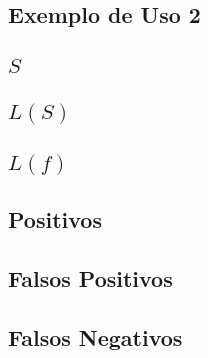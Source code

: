 \begin{apendicesenv}

\partapendices

\chapter{Exemplo de Uso 2} \label{apendice:eu2}
\section{$S$} \label{apendice:eu2:S}

\section{$L(S)$} \label{apendice:eu2:LS}

\section{$L(f)$} \label{apendice:eu2:Lf}

\section{Positivos} \label{apendice:eu2:positivo}

\section{Falsos Positivos} \label{apendice:eu2:falso_positivo}

\section{Falsos Negativos} \label{apendice:eu2:falso_negativo}

%


\end{apendicesenv}
